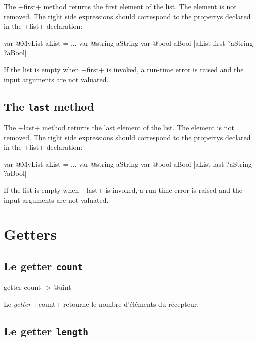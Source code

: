 The \ggs+first+ method returns the first element of the list. The element is not removed. The right side expressions should correspond to the propertys declared in the \ggs+list+ declaration:

\begin{galgas}
var @MyList aList = ...
var @string aString
var @bool aBool
[aList first ?aString ?aBool]
\end{galgas}

If the list is empty when \ggs+first+ is invoked, a run-time error is raised and the input arguments are not valuated.

\subsection{The \texttt{last} method}

The \ggs+last+ method returns the last element of the list. The element is not removed. The right side expressions should correspond to the propertys declared in the \ggs+list+ declaration:\\

\begin{galgas}
var @MyList aList = ...
var @string aString
var @bool aBool
[aList last ?aString ?aBool]
\end{galgas}


If the list is empty when \ggs+last+ is invoked, a run-time error is raised and the input arguments are not valuated.








\section{Getters}

\subsection{Le getter \texttt{count}}

\begin{galgas}
getter count -> @uint
\end{galgas}

Le \emph{getter} \ggs+count+ retourne le nombre d'éléments du récepteur.



\subsection{Le getter \texttt{length}}

